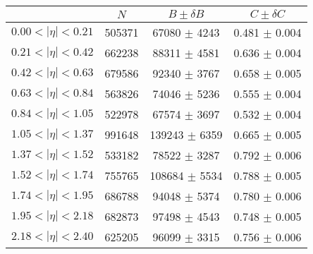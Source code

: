 \begin{tabular}{lccc}
\hline
    &   $N$   & $B \pm \delta B$  &  $C \pm \delta C$ \\
\hline
$0.00 < |\eta| <0.21$          & 505371     & 67080      $\pm$ 4243 & 0.481      $\pm$ 0.004 \\
$0.21 < |\eta| <0.42$          & 662238     & 88311      $\pm$ 4581 & 0.636      $\pm$ 0.004 \\
$0.42 < |\eta| <0.63$          & 679586     & 92340      $\pm$ 3767 & 0.658      $\pm$ 0.005 \\
$0.63 < |\eta| <0.84$          & 563826     & 74046      $\pm$ 5236 & 0.555      $\pm$ 0.004 \\
$0.84 < |\eta| <1.05$          & 522978     & 67574      $\pm$ 3697 & 0.532      $\pm$ 0.004 \\
$1.05 < |\eta| <1.37$          & 991648     & 139243     $\pm$ 6359 & 0.665      $\pm$ 0.005 \\
$1.37 < |\eta| <1.52$          & 533182     & 78522      $\pm$ 3287 & 0.792      $\pm$ 0.006 \\
$1.52 < |\eta| <1.74$          & 755765     & 108684     $\pm$ 5534 & 0.788      $\pm$ 0.005 \\
$1.74 < |\eta| <1.95$          & 686788     & 94048      $\pm$ 5374 & 0.780      $\pm$ 0.006 \\
$1.95 < |\eta| <2.18$          & 682873     & 97498      $\pm$ 4543 & 0.748      $\pm$ 0.005 \\
$2.18 < |\eta| <2.40$          & 625205     & 96099      $\pm$ 3315 & 0.756      $\pm$ 0.006 \\
\hline
\end{tabular}

